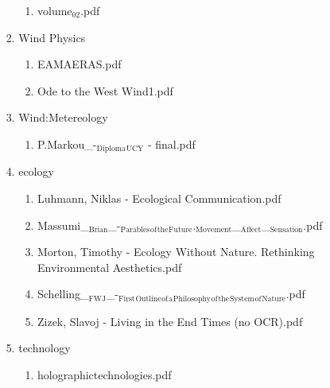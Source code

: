 \documentclass[11pt]{article}
\begin{document}
\begin{enumerate}
\begin{enumerate}
\begin{enumerate}
\begin{enumerate}
\begin{enumerate}
\item volume$_{\text{02}}$.pdf
\label{sec-1-1-1-1-7-3-48-9}
\end{enumerate}

\item Wind Physics
\label{sec-1-1-1-1-7-3-49}
\begin{enumerate}
\item EAMAERAS.pdf
\label{sec-1-1-1-1-7-3-49-1}

\item Ode to the West Wind1.pdf
\label{sec-1-1-1-1-7-3-49-2}
\end{enumerate}

\item Wind:Metereology
\label{sec-1-1-1-1-7-3-50}
\begin{enumerate}
\item P.Markou\_-$_{\text{Diploma}}$$_{\text{UCY}}$ - final.pdf
\label{sec-1-1-1-1-7-3-50-1}
\end{enumerate}

\item ecology
\label{sec-1-1-1-1-7-3-51}
\begin{enumerate}
\item Luhmann, Niklas - Ecological Communication.pdf
\label{sec-1-1-1-1-7-3-51-1}

\item Massumi\_$_{\text{Brian}}$\_-$_{\text{Parables}}$$_{\text{of}}$$_{\text{the}}$$_{\text{Future}}$.$_{\text{Movement}}$\_$_{\text{Affect}}$\_$_{\text{Sensation}}$.pdf
\label{sec-1-1-1-1-7-3-51-2}

\item Morton, Timothy - Ecology Without Nature. Rethinking Environmental Aesthetics.pdf
\label{sec-1-1-1-1-7-3-51-3}

\item Schelling\_$_{\text{FWJ}}$\_-$_{\text{First}}$$_{\text{Outline}}$$_{\text{of}}$$_{\text{a}}$$_{\text{Philosophy}}$$_{\text{of}}$$_{\text{the}}$$_{\text{System}}$$_{\text{of}}$$_{\text{Nature}}$.pdf
\label{sec-1-1-1-1-7-3-51-4}

\item Zizek, Slavoj - Living in the End Times (no OCR).pdf
\label{sec-1-1-1-1-7-3-51-5}
\end{enumerate}

\item technology
\label{sec-1-1-1-1-7-3-52}
\begin{enumerate}
\item holographictechnologies.pdf
\label{sec-1-1-1-1-7-3-52-1}
\end{enumerate}


\end{enumerate}
\end{enumerate}
\end{enumerate}
\end{enumerate}
\end{document}
